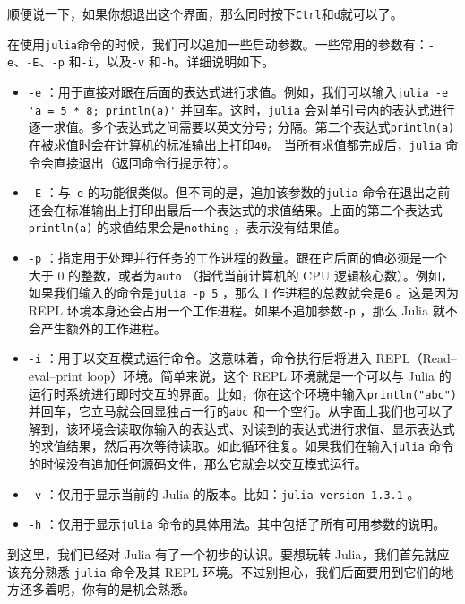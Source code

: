 顺便说一下，如果你想退出这个界面，那么同时按下\verb`Ctrl`和\verb`d`就可以了。

在使用\verb`julia`命令的时候，我们可以追加一些启动参数。一些常用的参数有：\verb`-e`、\verb`-E`、\verb`-p` 和\verb`-i`，以及\verb`-v` 和\verb`-h`。详细说明如下。

\begin{itemize}
\item \verb`-e` ：用于直接对跟在后面的表达式进行求值。例如，我们可以输入\verb`julia -e 'a = 5 * 8; println(a)'` 并回车。这时，\verb`julia` 会对单引号内的表达式进行逐一求值。多个表达式之间需要以英文分号\verb`;` 分隔。第二个表达式\verb`println(a)` 在被求值时会在计算机的标准输出上打印\verb`40`。 当所有求值都完成后，\verb`julia` 命令会直接退出（返回命令行提示符）。
\item \verb`-E` ：与\verb`-e` 的功能很类似。但不同的是，追加该参数的\verb`julia` 命令在退出之前还会在标准输出上打印出最后一个表达式的求值结果。上面的第二个表达式\verb`println(a)` 的求值结果会是\verb`nothing` ，表示没有结果值。
\item \verb`-p` ：指定用于处理并行任务的工作进程的数量。跟在它后面的值必须是一个大于 0 的整数，或者为\verb`auto` （指代当前计算机的 CPU 逻辑核心数）。例如，如果我们输入的命令是\verb`julia -p 5` ，那么工作进程的总数就会是\verb`6` 。这是因为 REPL 环境本身还会占用一个工作进程。如果不追加参数\verb`-p` ，那么 Julia 就不会产生额外的工作进程。
\item \verb`-i` ：用于以交互模式运行命令。这意味着，命令执行后将进入 REPL（Read–eval–print loop）环境。简单来说，这个 REPL 环境就是一个可以与 Julia 的运行时系统进行即时交互的界面。比如，你在这个环境中输入\verb`println("abc")` 并回车，它立马就会回显独占一行的\verb`abc` 和一个空行。从字面上我们也可以了解到，该环境会读取你输入的表达式、对读到的表达式进行求值、显示表达式的求值结果，然后再次等待读取。如此循环往复。如果我们在输入\verb`julia` 命令的时候没有追加任何源码文件，那么它就会以交互模式运行。
\item \verb`-v` ：仅用于显示当前的 Julia 的版本。比如：\verb`julia version 1.3.1` 。
\item \verb`-h` ：仅用于显示\verb`julia` 命令的具体用法。其中包括了所有可用参数的说明。
\end{itemize}

到这里，我们已经对 Julia 有了一个初步的认识。要想玩转 Julia，我们首先就应该充分熟悉 \verb`julia` 命令及其 REPL 环境。不过别担心，我们后面要用到它们的地方还多着呢，你有的是机会熟悉。

